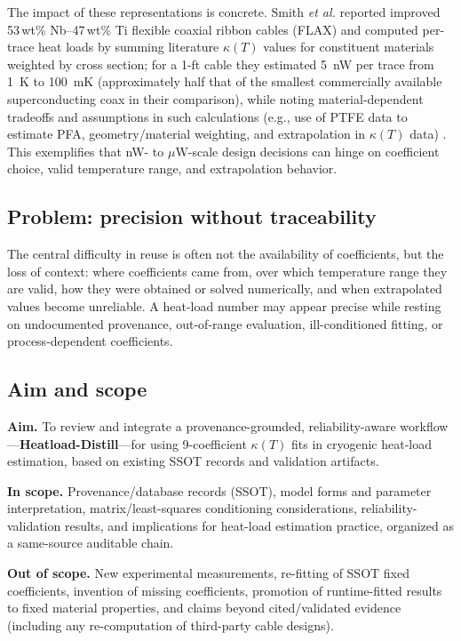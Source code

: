 \documentclass[11pt,a4paper]{article}
\begin{document}
The impact of these representations is concrete. Smith \textit{et al.} reported improved 53\,wt\% Nb--47\,wt\% Ti flexible coaxial ribbon cables (FLAX) and computed per-trace heat loads by summing literature $\kappa(T)$ values for constituent materials weighted by cross section; for a 1-ft cable they estimated 5~nW per trace from 1~K to 100~mK (approximately half that of the smallest commercially available superconducting coax in their comparison), while noting material-dependent tradeoffs and assumptions in such calculations (e.g., use of PTFE data to estimate PFA, geometry/material weighting, and extrapolation in $\kappa(T)$ data) \cite{smith2024}. This exemplifies that nW- to $\mu$W-scale design decisions can hinge on coefficient choice, valid temperature range, and extrapolation behavior.

\subsection{Problem: precision without traceability}
The central difficulty in reuse is often not the availability of coefficients, but the loss of context: where coefficients came from, over which temperature range they are valid, how they were obtained or solved numerically, and when extrapolated values become unreliable. A heat-load number may appear precise while resting on undocumented provenance, out-of-range evaluation, ill-conditioned fitting, or process-dependent coefficients.

\subsection{Aim and scope}
\textbf{Aim.} To review and integrate a provenance-grounded, reliability-aware workflow---\textbf{Heatload-Distill}---for using 9-coefficient $\kappa(T)$ fits in cryogenic heat-load estimation, based on existing SSOT records and validation artifacts.

\textbf{In scope.} Provenance/database records (SSOT), model forms and parameter interpretation, matrix/least-squares conditioning considerations, reliability-validation results, and implications for heat-load estimation practice, organized as a same-source auditable chain.

\textbf{Out of scope.} New experimental measurements, re-fitting of SSOT fixed coefficients, invention of missing coefficients, promotion of runtime-fitted results to fixed material properties, and claims beyond cited/validated evidence (including any re-computation of third-party cable designs).
\end{document}
